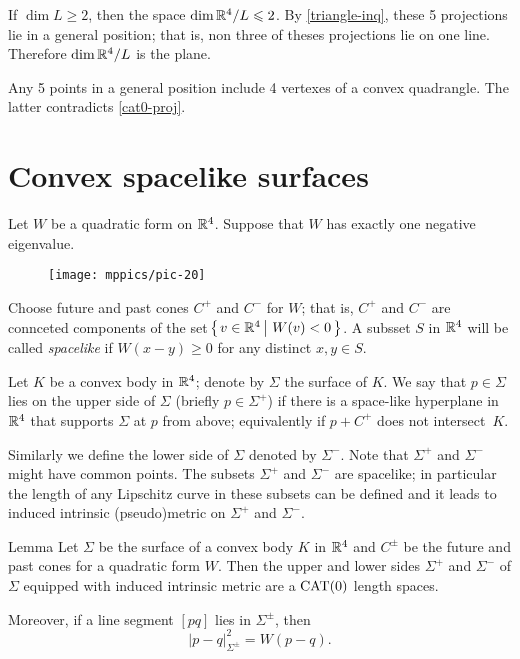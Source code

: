 \documentclass{article}
\begin{document}
If $\dim L\ge 2$, then the space $\mathop{\rm dim}\nolimits \mathbb{R}^4/L\leqslant 2$.
By \ref{triangle-inq}, these 5 projections lie in a general position; that is, non three of theses projections lie on one line. 
Therefore $\mathop{\rm dim}\nolimits \mathbb{R}^4/L$ is the plane.

Any 5 points in a general position include 4 vertexes of a convex quadrangle.
The latter contradicts \ref{cat0-proj}.
\qeds

\section{Convex spacelike surfaces}

Let $W$ be a quadratic form on $\mathbb{R}^4$.
Suppose that  $W$ has exactly one negative eigenvalue.

\begin{wrapfigure}{r}{55mm}
\vskip-4mm
\centering
\texttt{[image: mppics/pic-20]}
\end{wrapfigure}

Choose future and past cones $C^+$ and $C^-$ for $W$;
that is, $C^+$ and $C^-$ are connceted components of the set
$\set{v\in\RR^4}{W(v)< 0}$.
A subsset $S$ in $\mathbb{R}^4$ will be called \emph{spacelike} if $W(x-y)\ge 0$ for any distinct $x,y\in S$.

Let $K$ be a convex body in $\mathbb{R}^4$;
denote by $\Sigma$ the surface of $K$. 
We say that $p\in \Sigma$ lies on the upper side of $\Sigma$ (briefly $p\in\Sigma^+$) if there is a space-like hyperplane in $\mathbb{R}^4$ that supports $\Sigma$ at $p$ from above;
equivalently if $p+C^+$ does not intersect~$K$.

Similarly we define the lower side of $\Sigma$ denoted by $\Sigma^-$.
Note that $\Sigma^+$ and $\Sigma^-$ might have common points.
The subsets $\Sigma^+$ and $\Sigma^-$ are spacelike;
in particular the length of any Lipschitz curve in these subsets can be defined and it leads to induced intrinsic (pseudo)metric on $\Sigma^+$ and $\Sigma^-$. 

\begin{thm}{Lemma}\label{lem:sides}
Let $\Sigma$ be the surface of a convex body $K$ in $\mathbb{R}^4$ and $C^\pm$ be the future and past cones for a quadratic form $W$.
Then the upper and lower sides $\Sigma^+$ and $\Sigma^-$ of $\Sigma$ equipped with induced intrinsic metric are a $\mathrm{CAT}(0)$ length spaces.

Moreover, if a line segment $[pq]$ lies in $\Sigma^\pm$,
then 
\[|p-q|_{\Sigma^\pm}^2=W(p-q).\]

\end{thm}
\end{document}
